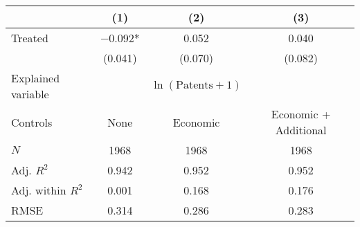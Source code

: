 
\begin{tabular}[t]{lccc}
\toprule
  & (1) & (2) & (3)\\
\midrule
Treated & \num{-0.092}* & \num{0.052} & \num{0.040}\\
 & (\num{0.041}) & (\num{0.070}) & (\num{0.082})\\
\midrule
Explained variable &  & $\ln(\text{Patents}+1)$ & \\
Controls & None & Economic & Economic + Additional\\
$N$ & \num{1968} & \num{1968} & \num{1968}\\
Adj. $R^2$ & \num{0.942} & \num{0.952} & \num{0.952}\\
Adj. within $R^2$ & \num{0.001} & \num{0.168} & \num{0.176}\\
RMSE & \num{0.314} & \num{0.286} & \num{0.283}\\
\bottomrule
\end{tabular}
